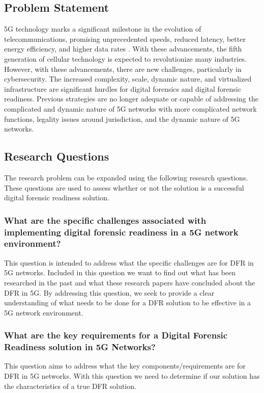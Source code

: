 \documentclass[final,1p,times,authoryear]{elsarticle}
\begin{document}
\subsection{Problem Statement}
\label{sub1sec1}
5G technology marks a significant milestone in the evolution of telecommunications, promising unprecedented speeds, reduced latency, better energy efficiency, and higher data rates \citep{hajlaoui20204g}. With these advancements, the fifth generation of cellular technology is expected to revolutionize many industries. However, with these advancements, there are new challenges, particularly in cybersecurity. The increased complexity, scale, dynamic nature, and virtualized infrastructure are significant hurdles for digital forensics and digital forensic readiness. Previous strategies are no longer adequate or capable of addressing the complicated and dynamic nature of 5G networks with more complicated network functions, legality issues around jurisdiction, and the dynamic nature of 5G networks\citep{sharevski2018towards}.

\subsection{Research Questions}
\label{sub1sec2}
The research problem can be expanded using the following research questions. These questions are used to assess whether or not the solution is a successful digital forensic readiness solution.

\subsubsection{What are the specific challenges associated with implementing digital forensic readiness in a 5G network environment?}
\label{sub1sub2sec1}
This question is intended to address what the specific challenges are for DFR in 5G networks. Included in this question we want to find out what has been researched in the past and what these research papers have concluded about the DFR in 5G. By addressing this question, we seek to provide a clear understanding of what needs to be done for a DFR solution to be effective in a 5G network environment.

\subsubsection{What are the key requirements for a Digital Forensic Readiness solution in 5G Networks?}
\label{sub1sub2sec2}
This question aims to address what the key components/requirements are for DFR in 5G networks. With this question we need to determine if our solution has the characteristics of a true DFR solution.
\end{document}
